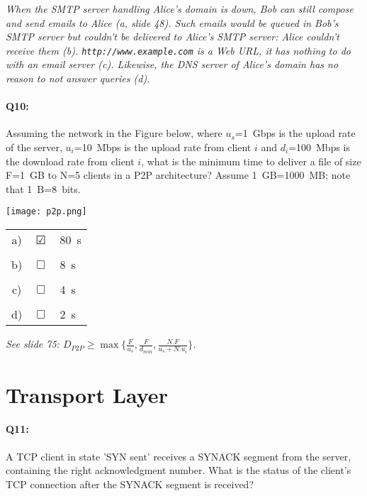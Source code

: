 \documentclass{llncs}
\newcommand{\answer}[1]{{\color{red}\textit{#1}\color{black}}}
\begin{document}
\answer{When the SMTP server handling Alice's domain is down, Bob can
  still compose and send emails to Alice (a, slide 48). Such emails
  would be queued in Bob's SMTP server but couldn't be delivered to
  Alice's SMTP server: Alice couldn't receive them
  (b). \texttt{http://www.example.com} is a Web URL, it has nothing to
  do with an email server (c). Likewise, the DNS server of Alice's
  domain has no reason to not answer queries (d).}

\paragraph{\textbf{Q10:}}

Assuming the network in the Figure below, where $u_s$=1~Gbps is the
upload rate of the server, $u_i$=10~Mbps is the upload rate from client $i$
and $d_i$=100~Mbps is the download rate from client $i$, what is the minimum
time to deliver a file of size F=1~GB to N=5 clients in a P2P
architecture? Assume 1~GB=1000~MB; note that 1~B=8~bits.

\texttt{[image: p2p.png]}

\begin{tabular}{ccl}
  a) & $\CheckedBox$ & 80~s\\
  \\
  b) & $\Box$ & 8~s\\
  \\
  c) & $\Box$ & 4~s\\
  \\
  d) & $\Box$ & 2~s\\
\end{tabular}

\answer{See slide 75: $D_{P2P}\geq
  \max\{\frac{F}{u_s},\frac{F}{d_{min}},\frac{N.F}{u_s+N.u_i}\}$.}

\section{Transport Layer}


\paragraph{\textbf{Q11:}}
A TCP client in state 'SYN sent' receives a SYNACK segment from the
server, containing the right acknowledgment number. What is the status
of the client's TCP connection after the SYNACK segment is received?
\end{document}
